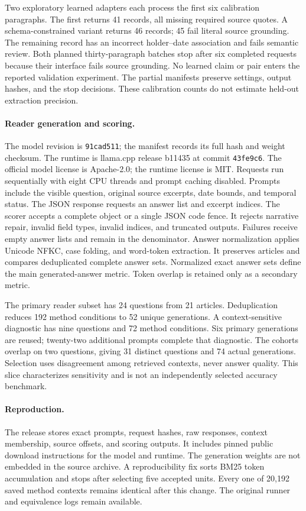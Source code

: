 Two exploratory learned adapters each process the first six calibration paragraphs.
The first returns 41 records, all missing required source quotes.
A schema-constrained variant returns 46 records; 45 fail literal source grounding.
The remaining record has an incorrect holder--date association and fails semantic review.
Both planned thirty-paragraph batches stop after six completed requests because their interface fails source grounding.
No learned claim or pair enters the reported validation experiment.
The partial manifests preserve settings, output hashes, and the stop decisions.
These calibration counts do not estimate held-out extraction precision.

\paragraph{Reader generation and scoring.}
The model revision is \texttt{91cad511}; the manifest records its full hash and weight checksum.
The runtime is llama.cpp release b11435 at commit \texttt{43fe9c6}.
The official model license is Apache-2.0; the runtime license is MIT.
Requests run sequentially with eight CPU threads and prompt caching disabled.
Prompts include the visible question, original source excerpts, date bounds, and temporal status.
The JSON response requests an answer list and excerpt indices.
The scorer accepts a complete object or a single JSON code fence.
It rejects narrative repair, invalid field types, invalid indices, and truncated outputs.
Failures receive empty answer lists and remain in the denominator.
Answer normalization applies Unicode NFKC, case folding, and word-token extraction.
It preserves articles and compares deduplicated complete answer sets.
Normalized exact answer sets define the main generated-answer metric.
Token overlap is retained only as a secondary metric.

The primary reader subset has 24 questions from 21 articles.
Deduplication reduces 192 method conditions to 52 unique generations.
A context-sensitive diagnostic has nine questions and 72 method conditions.
Six primary generations are reused; twenty-two additional prompts complete that diagnostic.
The cohorts overlap on two questions, giving 31 distinct questions and 74 actual generations.
Selection uses disagreement among retrieved contexts, never answer quality.
This slice characterizes sensitivity and is not an independently selected accuracy benchmark.

\paragraph{Reproduction.}
The release stores exact prompts, request hashes, raw responses, context membership, source offsets, and scoring outputs.
It includes pinned public download instructions for the model and runtime.
The generation weights are not embedded in the source archive.
A reproducibility fix sorts BM25 token accumulation and stops after selecting five accepted units.
Every one of 20,192 saved method contexts remains identical after this change.
The original runner and equivalence logs remain available.

